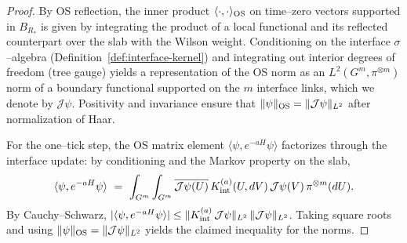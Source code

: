 \documentclass[11pt]{amsart}
\theoremstyle{plain}
\theoremstyle{definition}
\theoremstyle{remark}
\begin{document}
\begin{proof}
By OS reflection, the inner product $\langle\cdot,\cdot\rangle_{\rm OS}$ on time--zero vectors supported in $B_{R_*}$ is given by integrating the product of a local functional and its reflected counterpart over the slab with the Wilson weight. Conditioning on the interface $\sigma$--algebra (Definition~\ref{def:interface-kernel}) and integrating out interior degrees of freedom (tree gauge) yields a representation of the OS norm as an $L^2(G^m,\pi^{\otimes m})$ norm of a boundary functional supported on the $m$ interface links, which we denote by $\mathcal J\psi$. Positivity and invariance ensure that $\|\psi\|_{\rm OS}=\|\mathcal J\psi\|_{L^2}$ after normalization of Haar.

For the one--tick step, the OS matrix element $\langle\psi, e^{-aH}\psi\rangle$ factorizes through the interface update: by conditioning and the Markov property on the slab,
\[
  \langle\psi, e^{-aH}\psi\rangle\ =\ \int_{G^m}\int_{G^m} \overline{\mathcal J\psi(U)}\, K_{\rm int}^{(a)}(U,dV)\, \mathcal J\psi(V)\,\pi^{\otimes m}(dU).
\]
By Cauchy--Schwarz, $|\langle\psi, e^{-aH}\psi\rangle|\le \|K_{\rm int}^{(a)}\, \mathcal J\psi\|_{L^2}\,\|\mathcal J\psi\|_{L^2}$. Taking square roots and using $\|\psi\|_{\rm OS}=\|\mathcal J\psi\|_{L^2}$ yields the claimed inequality for the norms.
\end{proof}
\end{document}
